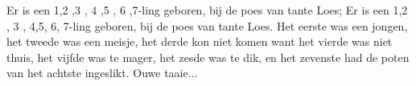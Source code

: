 \beginverse*
Er is een 1,2 ,3 , 4 ,5 , 6 ,7-ling geboren, bij de
poes van tante Loes;
Er is een 1,2 , 3 , 4,5, 6, 7-ling geboren, bij de
poes van tante Loes.
Het eerste was een jongen, het tweede was een meisje,
het derde kon niet komen want het vierde was niet thuis,
het vijfde was te mager, het zesde was te dik,
en het zevenste had de poten van het achtste ingeslikt. 
Ouwe taaie...
\endverse
\endsong